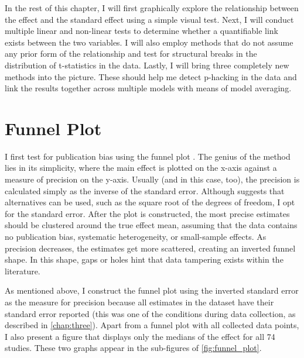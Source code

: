 In the rest of this chapter, I will first graphically explore the relationship between the effect and the standard effect using a simple visual test. Next, I will conduct multiple linear and non-linear tests to determine whether a quantifiable link exists between the two variables. I will also employ methods that do not assume any prior form of the relationship and test for structural breaks in the distribution of t-statistics in the data. Lastly, I will bring three completely new methods into the picture. These should help me detect p-hacking in the data and link the results together across multiple models with means of model averaging.

\section{Funnel Plot}
\label{sec:funnel_plot}

I first test for publication bias using the funnel plot \citep{Egger1997, stanley2005beyond}. The genius of the method lies in its simplicity, where the main effect is plotted on the x-axis against a measure of precision on the y-axis. Usually (and in this case, too), the precision is calculated simply as the inverse of the standard error. Although \cite{stanley2005beyond} suggests that alternatives can be used, such as the square root of the degrees of freedom, I opt for the standard error. After the plot is constructed, the most precise estimates should be clustered around the true effect mean, assuming that the data contains no publication bias, systematic heterogeneity, or small-sample effects. As precision decreases, the estimates get more scattered, creating an inverted funnel shape. In this shape, gaps or holes hint that data tampering exists within the literature.

As mentioned above, I construct the funnel plot using the inverted standard error as the measure for precision because all estimates in the dataset have their standard error reported (this was one of the conditions during data collection, as described in \autoref{chap:three}). Apart from a funnel plot with all collected data points, I also present a figure that displays only the medians of the effect for all 74 studies. These two graphs appear in the sub-figures of \autoref{fig:funnel_plot}.


